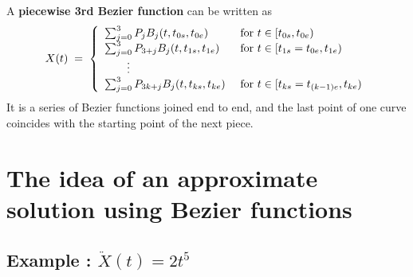 \documentclass[12pt]{article}
\begin{document}
A \textbf{piecewise 3rd Bezier function} can be written as
%
\begin{align*}
	X(t) \;=\; \left\{ \begin{array}{l l}
		\sum_{j=0}^3 P_j B_j(t,t_{0s},t_{0e}) & \textrm{ for } t\in [t_{0s},t_{0e}) \\
		\sum_{j=0}^3 P_{3+j} B_j(t,t_{1s},t_{1e}) & \textrm{ for } t\in [t_{1s}=t_{0e},t_{1e}) \\
		\qquad \vdots \\
		\sum_{j=0}^3 P_{3k+j} B_j(t,t_{ks},t_{ke}) & \textrm{ for } t\in [t_{ks}=t_{(k-1)e},t_{ke})
	\end{array} \right. 
\end{align*}
%
It is a series of Bezier functions joined end to end, and the last point of one curve coincides with the starting point of the next piece.






\section{The idea of an approximate solution using Bezier functions}





\subsection{Example : $\ddot{X}(t) = 2 t^5$}
\end{document}
